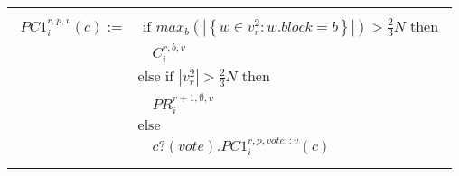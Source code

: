 \begin{center}
\begin{tabular}{l }
		\hline \\
		{$\!\begin{aligned}
		PC1_i^{r,p,v}(c) := 
			& \text{ if } max_{b}(|\left\{ w \in v_r^2 : w.block = b\right\}|) > \frac{2}{3} N \text{ then} \\
				& \quad C_i^{r,b,v} \\
			& \text{else if }  | v_r^2 | > \frac{2}{3} N \text{ then} \\ 
				& \quad PR_i^{r+1,\emptyset,v} \\ 
			& \text{else} \\
				& \quad c?(vote) . PC1_i^{r,p,vote::v}(c) \\
		\end{aligned}$}


	\end{tabular}
\end{center}

